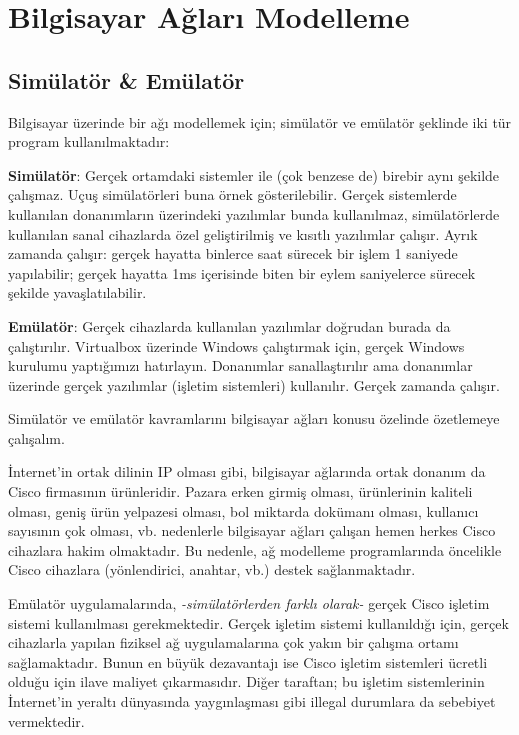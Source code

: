\section{Bilgisayar Ağları Modelleme}

\subsection{Simülatör \& Emülatör}

Bilgisayar üzerinde bir ağı modellemek için; simülatör ve emülatör şeklinde iki tür program kullanılmaktadır:

\textbf{Simülatör}: Gerçek ortamdaki sistemler ile (çok benzese de) birebir aynı şekilde çalışmaz. Uçuş simülatörleri buna örnek gösterilebilir. Gerçek sistemlerde kullanılan donanımların üzerindeki yazılımlar bunda kullanılmaz, simülatörlerde kullanılan sanal cihazlarda özel geliştirilmiş ve kısıtlı yazılımlar çalışır. Ayrık zamanda çalışır: gerçek hayatta binlerce saat sürecek bir işlem 1 saniyede yapılabilir;  gerçek hayatta 1ms içerisinde biten bir eylem saniyelerce sürecek şekilde yavaşlatılabilir.

\vskip 0.5cm
\textbf{Emülatör}: Gerçek cihazlarda kullanılan yazılımlar doğrudan burada da çalıştırılır. Virtualbox üzerinde Windows çalıştırmak için, gerçek Windows kurulumu yaptığımızı hatırlayın. Donanımlar sanallaştırılır ama donanımlar üzerinde gerçek yazılımlar (işletim sistemleri) kullanılır. Gerçek zamanda çalışır.

\vskip 0.5cm
Simülatör ve emülatör kavramlarını bilgisayar ağları konusu özelinde özetlemeye çalışalım.
\vskip 0.5cm

İnternet'in ortak dilinin IP olması gibi, bilgisayar ağlarında ortak donanım da Cisco firmasının ürünleridir. Pazara erken girmiş olması, ürünlerinin kaliteli olması, geniş ürün yelpazesi olması, bol miktarda dokümanı olması, kullanıcı sayısının çok olması, vb. nedenlerle bilgisayar ağları çalışan hemen herkes Cisco cihazlara hakim olmaktadır. Bu nedenle, ağ modelleme programlarında öncelikle Cisco cihazlara (yönlendirici, anahtar, vb.) destek sağlanmaktadır.

Emülatör uygulamalarında, \textit{-simülatörlerden farklı olarak-} gerçek Cisco işletim sistemi kullanılması gerekmektedir. Gerçek işletim sistemi kullanıldığı için, gerçek cihazlarla yapılan fiziksel ağ uygulamalarına çok yakın bir çalışma ortamı sağlamaktadır. Bunun en büyük dezavantajı ise Cisco işletim sistemleri ücretli olduğu için ilave maliyet çıkarmasıdır. Diğer taraftan; bu işletim sistemlerinin İnternet'in yeraltı dünyasında yaygınlaşması gibi illegal durumlara da sebebiyet vermektedir.

